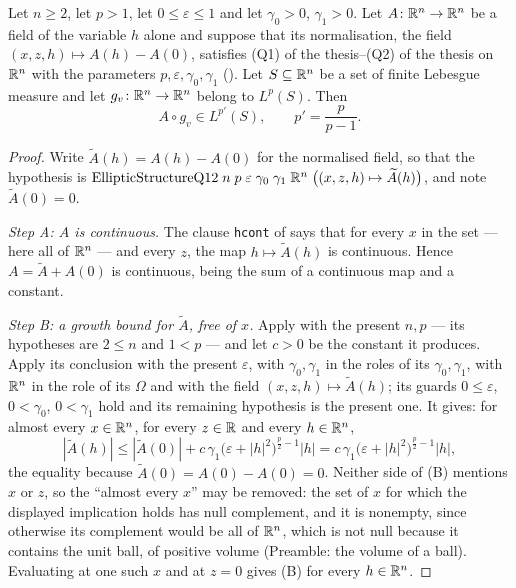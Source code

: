 \begin{lemma}
Let $n\ge2$, let $p>1$, let $0\le\varepsilon\le1$ and let $\gamma_0>0$,
$\gamma_1>0$.  Let $A\colon\mathbb{R}^n\to\mathbb{R}^n$ be a field of the variable $h$ alone and
suppose that its normalisation, the field
$(x,z,h)\mapsto A(h)-A(0)$, satisfies (Q1) of the thesis--(Q2) of the thesis on $\mathbb{R}^n$
with the parameters $p,\varepsilon,\gamma_0,\gamma_1$
().  Let $S\subseteq\mathbb{R}^n$ be a set of finite
Lebesgue measure and let $g_v\colon\mathbb{R}^n\to\mathbb{R}^n$ belong to $L^{p}(S)$.  Then
\[
A\circ g_v\in L^{p'}(S),\qquad p'=\frac p{p-1} .
\]
\end{lemma}
\begin{proof}
Write $\widetilde A(h)=A(h)-A(0)$ for the normalised field, so that the
hypothesis is
$\mathrm{EllipticStructureQ12}\;n\;p\;\varepsilon\;\gamma_0\;\gamma_1\;\mathbb{R}^n\;
\bigl((x,z,h)\mapsto\widetilde A(h)\bigr)$, and note $\widetilde A(0)=0$.

\emph{Step A: $A$ is continuous.}  The clause \texttt{hcont} of
 says that for every $x$ in the set --- here all
of $\mathbb{R}^n$ --- and every $z$, the map $h\mapsto\widetilde A(h)$ is continuous.
Hence $A=\widetilde A+A(0)$ is continuous, being the sum of a continuous map and
a constant.

\emph{Step B: a growth bound for $\widetilde A$, free of $x$.}  Apply
 with the present $n,p$ --- its hypotheses are
$2\le n$ and $1<p$ --- and let $c>0$ be the constant it produces.  Apply its
conclusion with the present $\varepsilon$, with $\gamma_0,\gamma_1$ in the roles
of its $\gamma_0,\gamma_1$, with $\mathbb{R}^n$ in the role of its $\Omega$ and with the
field $(x,z,h)\mapsto\widetilde A(h)$; its guards $0\le\varepsilon$,
$0<\gamma_0$, $0<\gamma_1$ hold and its remaining hypothesis is the present
one.  It gives: for almost every $x\in\mathbb{R}^n$, for every $z\in\mathbb{R}$ and every
$h\in\mathbb{R}^n$,
\[
|\widetilde A(h)|\le|\widetilde A(0)|
+c\,\gamma_1\bigl(\varepsilon+|h|^2\bigr)^{\frac p2-1}|h|
=c\,\gamma_1\bigl(\varepsilon+|h|^2\bigr)^{\frac p2-1}|h| ,
\tag{B}
\]
the equality because $\widetilde A(0)=A(0)-A(0)=0$.  Neither side of (B)
mentions $x$ or $z$, so the ``almost every $x$'' may be removed: the set of
$x$ for which the displayed implication holds has null complement, and it is
nonempty, since otherwise its complement would be all of $\mathbb{R}^n$, which is not
null because it contains the unit ball, of positive volume (Preamble: the
volume of a ball).  Evaluating at one such $x$ and at $z=0$ gives (B) for every
$h\in\mathbb{R}^n$.


\end{proof}
